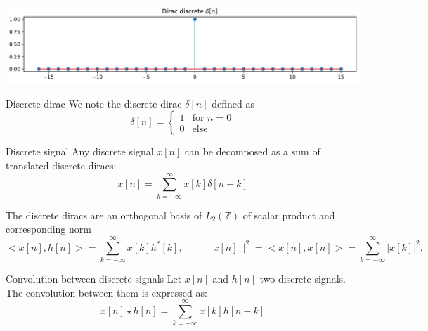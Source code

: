 \begin{center}
  \includegraphics[width=.8\linewidth]{imgs/sig_conv/dirac_delta_discrete}
\end{center}\vspace{-5mm}

\begin{block}{Discrete dirac}
  We note the discrete dirac $\delta[n]$ defined as\vspace{-2mm}
  \begin{equation}
      \delta[n]=
      \begin{cases}
          1& \text{for } n=0\\
          0 & \text{else}
        \end{cases}
      \label{eq:discrete_dirac}
  \end{equation}\vspace{-5mm}
\end{block}

\begin{block}{Discrete signal}
  Any discrete signal $x[n]$ can be decomposed as a sum of translated discrete diracs:\vspace{-1mm}
  \begin{equation}
      x[n]=\sum_{k=-\infty}^\infty x[k]\delta[n-k]
      \label{eq:discreet_signal_dirac}
  \end{equation}\vspace{-2mm}

  The discrete diracs are an orthogonal basis of $L_2(\mathbb{Z})$ of scalar product and corresponding norm  \vspace{-2mm}$$<x[n],h[n]>=\sum_{k=-\infty}^\infty x[k]h^*[k],\qquad \|x[n]\|^2=<x[n],x[n]>=\sum_{k=-\infty}^\infty |x[k]|^2.$$ 
\end{block}


\begin{block}{Convolution between discrete signals}
  Let $x[n]$ and $h[n]$ two discrete signals. The convolution between them is expressed as:
  \begin{equation}
      x[n]\star h[n]= \sum_{k=-\infty}^\infty x[k]h[n-k]
      \label{eq:discrete_convolution}
  \end{equation}

\end{block}

